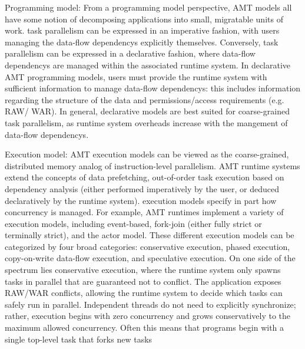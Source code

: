 \begin{compactdesc}
\item[Programming model:]
From a \gls{programming model} perspective,
\gls{AMT} models all have some notion of decomposing applications into small,
\gls{migratable} units of work. 
\Gls{task parallelism} can be expressed in an \gls{imperative}
fashion, with users managing the \glspl{data-flow dependency} explicitly
themselves.  Conversely, \gls{task parallelism} can be expressed in a \gls{declarative}
fashion, where \glspl{data-flow dependency} are managed within the associated \gls{runtime system}. 
  In \gls{declarative} \gls{AMT} \glspl{programming model}, users must provide
  the \gls{runtime system} with sufficient information to manage
  \glspl{data-flow dependency}: this includes information regarding the
  structure of the data and permissions/access requirements (e.g. \gls{RAW}/
  \gls{WAR}).  In general, \gls{declarative} models are best suited for coarse-grained \gls{task
parallelism}, as \gls{runtime system} overheads increase with the mangement of
\glspl{data-flow dependency}.  
\item[Execution model:]
  \gls{AMT} \glspl{execution model} can be viewed as the coarse-grained,
  distributed memory analog of instruction-level parallelism. 
  \gls{AMT} \glspl{runtime system} extend the concepts of \gls{data
  prefetching}, out-of-order task execution based on dependency analysis (either performed
    imperatively by the user, or deduced declaratively by the \gls{runtime
    system}).     \Glspl{execution model} specify in part how \gls{concurrency} is
    managed. For example, \gls{AMT} runtimes implement a variety of
    \glspl{execution model}, including \gls{event-based}, \gls{fork-join} (either
    \gls{fully strict} or \gls{terminally strict}), and the \gls{actor
    model}. These different \glspl{execution model} can be categorized by four broad
    categories: \gls{conservative execution}, \gls{phased execution}, 
    \gls{copy-on-write data-flow execution}, and \gls{speculative execution}.
    On one side of the spectrum lies \gls{conservative execution}, where the \gls{runtime system} only spawns tasks in parallel 
    that are guaranteed not to conflict.  The application exposes \gls{RAW}/\gls{WAR} conflicts, allowing the
    \gls{runtime system} to decide which tasks can safely run in parallel.  Independent threads do not need to explicitly synchronize; 
    rather, execution begins with zero \gls{concurrency} and grows conservatively to the maximum allowed \gls{concurrency}.
    Often this means that programs begin with a single top-level task that forks new tasks 

\end{compactdesc}
